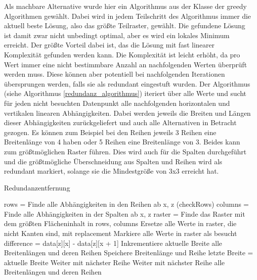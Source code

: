 Als machbare Alternative wurde hier ein Algorithmus aus der Klasse der greedy Algorithmen gewählt. Dabei wird in jedem Teilschritt des Algorithmus immer die aktuell beste Lösung, also das größte Teilraster, gewählt. Die gefundene Lösung ist damit zwar nicht unbedingt optimal, aber es wird ein lokales Minimum erreicht. Der größte Vorteil dabei ist, das die Lösung mit fast linearer Komplexität gefunden werden kann. Die Komplexität ist leicht erhöht, da pro Wert immer eine nicht bestimmbare Anzahl an nachfolgenden Werten überprüft werden muss. Diese können aber potentiell bei nachfolgenden Iterationen übersprungen werden, falls sie als redundant eingestuft wurden. Der Algorithmus (siehe Algorithmus \ref{redundanz_algorithmus}) iteriert über alle Werte und sucht für jeden nicht besuchten Datenpunkt alle nachfolgenden horizontalen und vertikalen linearen Abhängigkeiten. Dabei werden jeweils die Breiten und Längen dieser Abhängigkeiten zurückgeliefert und auch alle Alternativen in Betracht gezogen. Es können zum Beispiel bei den Reihen jeweils 3 Reihen eine Breitenlänge von 4 haben oder 5 Reihen eine Breitenlänge von 3. Beides kann zum größtmöglichen Raster führen. Dies wird auch für die Spalten durchgeführt und die größtmögliche Überschneidung aus Spalten und Reihen wird als redundant markiert, solange sie die Mindestgröße von 3x3 erreicht hat.

\begin{algorithm}[H]
\begin{algorithmic}
\caption{Redundanzentfernung}
\label{redundanz_algorithmus}
            \State rows = Finde alle Abhängigkeiten in den Reihen ab x, z (checkRows)
            \State columns = Finde alle Abhängigkeiten in der Spalten ab x, z
            \State raster = Finde das Raster mit dem größten Flächeninhalt in rows, columns
                \State Ersetze alle Werte in raster, die nicht Kanten sind, mit replacement
                \State Markiere alle Werte in raster als besucht
            \EndIf
        \EndIf     
    \EndFor
\EndProcedure
{}
        \State difference = data[z][x] - data[z][x + 1]
                \State Inkrementiere aktuelle Breite
                \State\Return alle Breitenlängen und deren Reihen
                \State Speichere Breitenlänge und Reihe
                \State letzte Breite = aktuelle Breite
                \State Weiter mit nächster Reihe
            \Else
                \State Weiter mit nächster Reihe
            \EndIf
        \EndFor
    \EndFor
    \State\Return alle Breitenlängen und deren Reihen
\EndProcedure
\end{algorithmic}
\end{algorithm}
